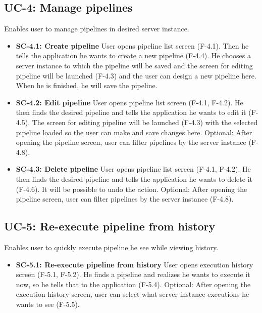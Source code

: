 \subsection*{UC-4: Manage pipelines}
Enables user to manage pipelines in desired server instance.

\begin{itemize}
\item \textbf{SC-4.1: Create pipeline}
User opens pipeline list screen (F-4.1). Then he tells the application he wants to create a new pipeline (F-4.4). He chooses a server instance to which the pipeline will be saved and the screen for editing pipeline will be launched (F-4.3) and the user can design a new pipeline here. When he is finished, he will save the pipeline.

\item \textbf{SC-4.2: Edit pipeline}
User opens pipeline list screen (F-4.1, F-4.2). He then finds the desired pipeline and tells the application he wants to edit it (F-4.5). The screen for editing pipeline will be launched (F-4.3) with the selected pipeline loaded so the user can make and save changes here. Optional: After opening the pipeline screen, user can filter pipelines by the server instance (F-4.8).

\item \textbf{SC-4.3: Delete pipeline}
User opens pipeline list screen (F-4.1, F-4.2). He then finds the desired pipeline and tells the application he wants to delete it (F-4.6). It will be possible to undo the action. Optional: After opening the pipeline screen, user can filter pipelines by the server instance (F-4.8).

\end{itemize}

\subsection*{UC-5: Re-execute pipeline from history}
Enables user to quickly execute pipeline he see while viewing history.

\begin{itemize}
\item \textbf{SC-5.1: Re-execute pipeline from history}
User opens execution history screen (F-5.1, F-5.2). He finds a pipeline and realizes he wants to execute it now, so he tells that to the application (F-5.4). Optional: After opening the execution history screen, user can select what server instance executions he wants to see (F-5.5).

\end{itemize}

